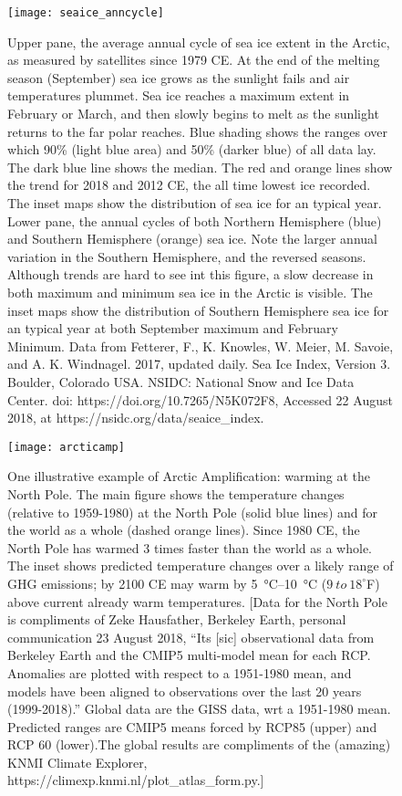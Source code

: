 \documentclass[amstex,12pt]{book}
\begin{document}
\begin{figure}[p]
	\centering
  \texttt{[image: seaice\_anncycle]}%
	\caption{Upper pane, the average annual cycle of sea ice extent in the Arctic, as measured by satellites since 1979 CE. At the end of the melting season (September) sea ice grows as the sunlight fails and air temperatures plummet. Sea ice reaches a maximum extent in February or March, and then slowly begins to melt as the sunlight returns to the far polar reaches. Blue shading shows the ranges over which 90\% (light blue area) and 50\% (darker blue) of all data lay. The dark blue line shows the median. The red and orange lines show the trend for 2018 and 2012 CE, the all time lowest ice recorded. The inset maps show the distribution of sea ice for an typical year. Lower pane, the annual cycles of both Northern Hemisphere (blue) and Southern Hemisphere (orange) sea ice. Note the larger annual variation in the Southern Hemisphere, and the reversed seasons. Although trends are hard to see int this figure, a slow decrease in both maximum and minimum sea ice in the Arctic is visible. The inset maps show the distribution of Southern Hemisphere sea ice for an typical year at both September maximum and February Minimum. Data from Fetterer, F., K. Knowles, W. Meier, M. Savoie, and A. K. Windnagel. 2017, updated daily. Sea Ice Index, Version 3. Boulder, Colorado USA. NSIDC: National Snow and Ice Data Center. doi: https://doi.org/10.7265/N5K072F8, Accessed 22 August 2018, at https://nsidc.org/data/seaice\_index.}
	\label{fig:seaice_anncycle}
\end{figure}

\begin{figure}[p]
	\centering
  \texttt{[image: arcticamp]}%
	\caption{One illustrative example of Arctic Amplification: warming at the North Pole. The main figure shows the temperature changes (relative to 1959-1980) at the North Pole (solid blue lines) and for the world as a whole (dashed orange lines). Since 1980 CE, the North Pole has warmed 3 times faster than the world as a whole. The inset shows predicted temperature changes over a likely range of GHG emissions; by 2100 CE may warm by \SIrange{5}{10}{\celsius} ($9\ to\ 18^{\circ}$F) above current already warm temperatures. [Data for the North Pole is compliments of Zeke Hausfather, Berkeley Earth, personal communication 23 August 2018, ``Its [sic] observational data from Berkeley Earth and the CMIP5 multi-model mean for each RCP. Anomalies are plotted with respect to a 1951-1980 mean, and models have been aligned to observations over the last 20 years (1999-2018).'' Global data are the GISS data, wrt a 1951-1980 mean. Predicted ranges are CMIP5 means forced by RCP85 (upper) and RCP 60 (lower).The global results are compliments of the (amazing) KNMI Climate Explorer, https://climexp.knmi.nl/plot\_atlas\_form.py.]}
	\label{fig:aa}
\end{figure}
\end{document}
